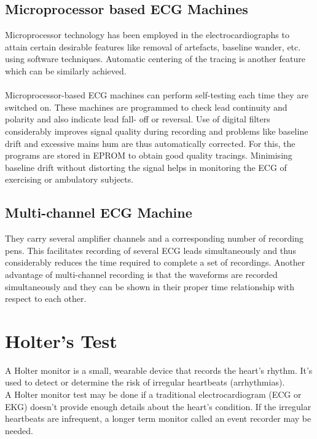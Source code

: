 \documentclass{article}
\begin{document}
\subsection{Microprocessor based ECG Machines}
Microprocessor technology has been employed in the electrocardiographs to attain certain desirable features like removal of artefacts, baseline wander, etc. using software techniques. Automatic centering of the tracing is another feature which can be similarly achieved.\\
\\
Microprocessor-based ECG machines can perform self-testing each time they are switched on. These machines are programmed to check lead continuity and polarity and also indicate lead fall- off or reversal. Use of digital filters considerably improves signal quality during recording and problems like baseline drift and excessive mains hum are thus automatically corrected. For this, the programs are stored in EPROM to obtain good quality tracings. Minimising baseline drift without distorting the signal helps in monitoring the ECG of exercising or ambulatory subjects.
\subsection{Multi-channel ECG Machine}
They carry several amplifier channels and a corresponding number of recording pens. This facilitates recording of several ECG leads simultaneously and thus considerably reduces the time required to complete a set of recordings. Another advantage of multi-channel recording is that the waveforms are recorded simultaneously and they can be shown in their proper time relationship with respect to each other.
\section{Holter's Test}
A Holter monitor is a small, wearable device that records the heart's rhythm. It's used to detect or determine the risk of irregular heartbeats (arrhythmias).
\\
A Holter monitor test may be done if a traditional electrocardiogram (ECG or EKG) doesn't provide enough details about the heart's condition. If the irregular heartbeats are infrequent, a longer term monitor called an event recorder may be needed.
\end{document}
